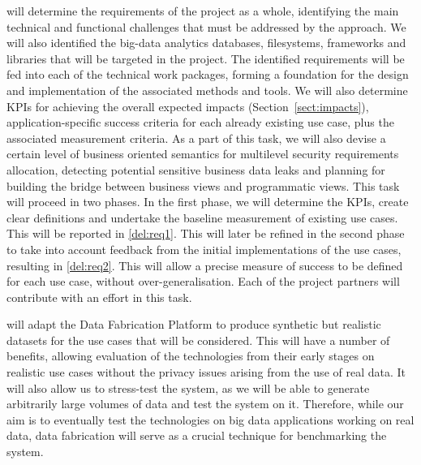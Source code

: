 \begin{Workpackage}{\thewpno}
\begin{Task}
\TaskResults{%
\ref{del:req1},
\ref{del:req2}
}
\TaskHeader{}
\theTask{} will determine the requirements of the \TheProject{} project as a whole, identifying the main technical and functional challenges that must be addressed by the \TheProject{} approach. We will also identified the big-data analytics databases, filesystems, frameworks and libraries that will be targeted in the project. The identified  requirements will be fed into each of the technical work packages, forming a foundation for the design and implementation of the associated methods and tools. We will also determine KPIs for achieving the overall expected impacts (Section~\ref{sect:impacts}), application-specific success criteria for each already existing use case, plus the associated measurement criteria. As a part of this task, we will also devise a certain level of business oriented semantics for multilevel security requirements allocation, detecting potential sensitive business data leaks and planning for building the bridge between business views and programmatic views. This task will proceed in two phases. In the first phase, we will determine the KPIs, create clear definitions and undertake the baseline measurement of existing use cases. This will be reported in \ref{del:req1}. This will later be refined in the second phase to take into account feedback from the initial implementations of the use cases, resulting in \ref{del:req2}. This will allow a precise measure of success to be defined for each use case, without over-generalisation. Each of the project partners will contribute with an effort in this task.
\end{Task}

\begin{Task}
\TaskResults{%
\ref{del:eval1},
\ref{del:eval2},
\ref{del:eval3}
}
\TaskHeader{}
\theTask{} will adapt the \IBMshort{} Data Fabrication Platform to produce synthetic but realistic datasets for the use cases that will be considered. This will have a number of benefits, allowing evaluation of the \TheProject{} technologies from their early stages on realistic use cases without the privacy issues arising from the use of real data. It will also allow us to stress-test the system, as we will be able to generate arbitrarily large volumes of data and test the system on it. Therefore, while our aim is to eventually test the \TheProject{} technologies on big data applications working on real data, data fabrication will serve as a crucial technique for benchmarking the system.
\end{Task}


\end{Workpackage}
